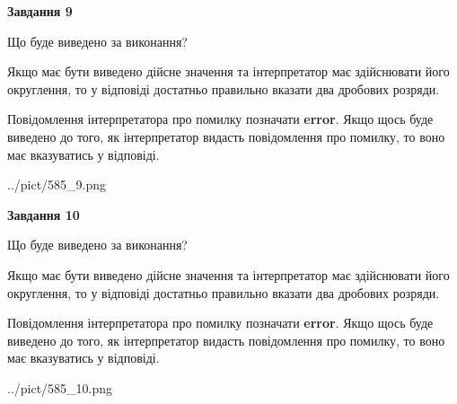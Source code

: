 \documentclass[12pt, ukrainian]{article}
\begin{document}
{\begin {Large}
{\begin {center}\textbf{Завдання 9}\end {center}}\par
Що буде виведено за виконання? \par

Якщо має бути виведено дійсне значення та інтерпретатор має здійснювати його округлення, 
то у відповіді достатньо правильно вказати два дробових розряди.

Повідомлення інтерпретатора про помилку позначати \textbf{error}.
Якщо щось буде виведено до того, як інтерпретатор видасть повідомлення про помилку, 
то воно має вказуватись у відповіді. \par

\begin{center}
	{../pict/585_9.png}
\end{center}
\newpage

{\begin {center}\textbf{Завдання 10}\end {center}}\par
Що буде виведено за виконання? \par

Якщо має бути виведено дійсне значення та інтерпретатор має здійснювати його округлення, 
то у відповіді достатньо правильно вказати два дробових розряди.

Повідомлення інтерпретатора про помилку позначати \textbf{error}.
Якщо щось буде виведено до того, як інтерпретатор видасть повідомлення про помилку, 
то воно має вказуватись у відповіді. \par

\begin{center}
	{../pict/585_10.png}
\end{center}
\newpage

\end {Large}}
\end{document}
